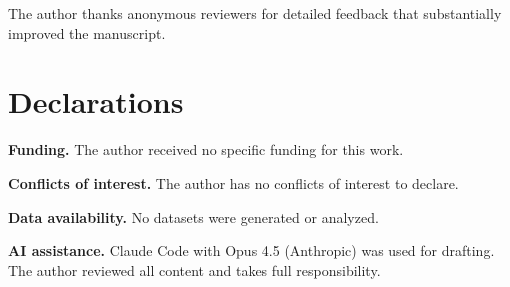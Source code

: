 \documentclass[12pt]{article}
\begin{document}
The author thanks anonymous reviewers for detailed feedback that substantially improved the manuscript.

\section*{Declarations}

\textbf{Funding.} The author received no specific funding for this work.

\textbf{Conflicts of interest.} The author has no conflicts of interest to declare.

\textbf{Data availability.} No datasets were generated or analyzed.

\textbf{AI assistance.} Claude Code with Opus 4.5 (Anthropic) was used for drafting. The author reviewed all content and takes full responsibility.
\end{document}
